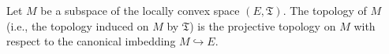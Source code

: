 Let $M$ be a subspace of the locally convex space $(E, \mathfrak{T})$. The topology of $M$ (i.e., the topology induced on $M$ by $\mathfrak{T}$) is the projective topology on $M$ with respect to the canonical imbedding $M \hookrightarrow E$.
